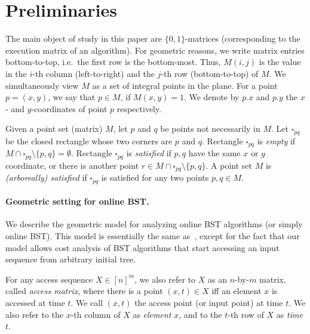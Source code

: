 \section{Preliminaries}
\label{sec:prelim-short}

The main object of study in this paper are $\{0,1\}$-matrices (corresponding to the execution matrix of an algorithm). 
For geometric reasons, we write matrix entries bottom-to-top, i.e.\ the first row is the bottom-most. Thus, $M(i,j)$ is the value in the $i$-th column (left-to-right) and the $j$-th row (bottom-to-top) of $M$. We simultaneously view $M$ as a set of integral points in the plane. For a point $p=(x,y)$, we say that $p \in M$, if $M(x,y) = 1$.
We denote by $p.x$ and $p.y$ the $x$- and $y$-coordinates of point $p$ respectively. 


Given a point set (matrix) $M$, let $p$ and $q$ be points not necessarily
in $M$. Let $\square_{pq}$ be the closed rectangle whose two corners
are $p$ and $q$. Rectangle $\square_{pq}$ is \emph{empty} if
$M \cap \square_{pq} \setminus \{p,q\} = \emptyset$. Rectangle $\square_{pq}$
is \emph{satisfied} if $p,q$ have the same $x$ or $y$ coordinate,
or there is another point $r\in M \cap \square_{pq} \setminus\{p,q\}$.
A point set $M$ is \emph{(arboreally) satisfied} if  
$\square_{pq}$ is satisfied for any two points $p,q \in M$. %


\paragraph{Geometric setting for online BST.}



We describe the geometric model for analyzing online BST algorithms (or simply online BST). 
This model is essentially the same as~\cite{DHIKP09}, except for the fact that our model allows cost analysis of  BST algorithms that start accessing an input sequence from arbitrary initial tree.  

For any access sequence $X\in [n]^m$, we also refer to $X$ as an
$n$-by-$m$ matrix, called \emph{access matrix}, where there is a
point $(x,t)\in X$ iff an element $x$ is accessed at time $t$.
We call $(x,t)$ the access point (or input point) at time $t$.
We also refer to the $x$-th column of $X$ as \emph{element} $x$,
and to the $t$-th row of $X$ as \emph{time} $t$. 

